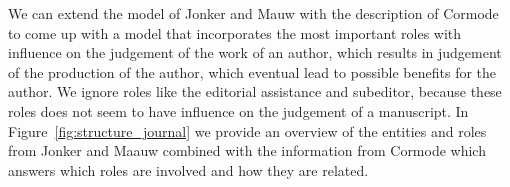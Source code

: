 \documentclass{ou-report}
\newcommand{\outline}[1]{{\color{blue} #1}}
\begin{document}





We can extend the model of Jonker and Mauw with the description of Cormode to 
come up 
with a model that incorporates the most important roles with influence on the 
judgement of the work of an author, which results in judgement of the production 
of the author, which eventual lead to possible benefits for the author. We 
ignore roles like the editorial assistance and subeditor, because these roles 
does not seem to have influence on the judgement of a manuscript. In 
Figure~\ref{fig:structure_journal} we provide an overview of the entities and 
roles from Jonker and Maauw combined with the information from Cormode which 
answers which roles are involved and how they are related.
\end{document}
